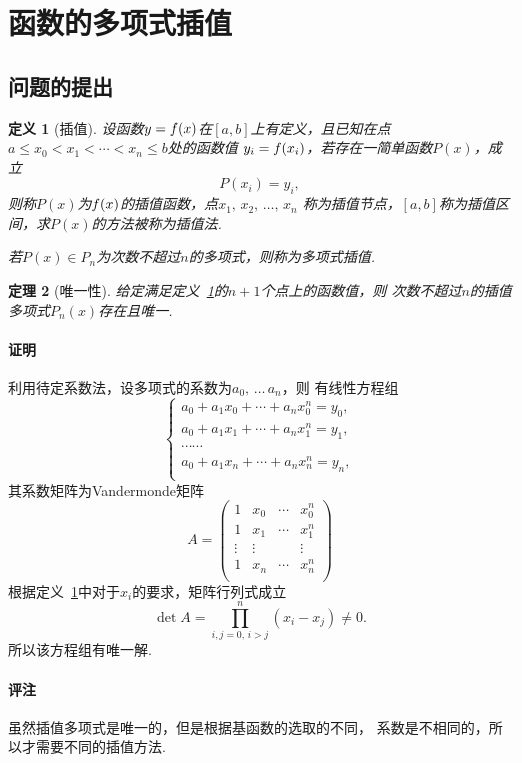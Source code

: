 \documentclass[12pt, a4paper]{article}
\theoremstyle{margin}
\newtheorem{thm}{定理}
\newtheorem{defi}[thm]{定义}
\newcommand{\f}{\mathnormal{f}}
\newcommand\defref[1]{定义~\ref{#1}}
\newcommand{\remark}{\paragraph{评注}}
\newcommand{\proof}{\paragraph{证明}}
\begin{document}
\newpage
\section{函数的多项式插值}
\subsection{问题的提出}
  \begin{defi}[插值]
    \label{defi: 插值}
    设函数$y = \f(x)$在$[a, b]$上有定义，且已知在点
    $a\le x_0 < x_1 < \cdots < x_n \le b$处的函数值
    $y_i = \f(x_i)$，若存在一简单函数$P(x)$，成立
    \[
      P(x_i) = y_i,
    \]
    则称$P(x)$为$\f(x)$的插值函数，点$x_1,\,x_2,\,\dots,\,x_n$
    称为插值节点，$[a, b]$称为插值区间，求$P(x)$的方法被称为插值法. \par
    若$P(x) \in P_n$为次数不超过$n$的多项式，则称为多项式插值.
  \end{defi}

  \begin{thm}[唯一性]
    给定满足\defref{defi: 插值}的$n+1$个点上的函数值，则
    次数不超过$n$的插值多项式$P_n(x)$存在且唯一.
  \end{thm}
  \proof
    利用待定系数法，设多项式的系数为$a_0,\,\dots\,a_n$，则
    有线性方程组
    \[
      \left\{
      \begin{gathered}
          a_0 + a_1x_0 + \cdots + a_nx_0^n = y_0,\\
          a_0 + a_1x_1 + \cdots + a_nx_1^n = y_1,\\
          \cdots\cdots \\
          a_0 + a_1x_n + \cdots + a_nx_n^n = y_n,\\
      \end{gathered}
      \right.
    \]
    其系数矩阵为Vandermonde矩阵
    \[
      A =
      \begin{pmatrix}
        1 & x_0 & \cdots & x_0^n \\
        1 & x_1 & \cdots & x_1^n \\
        \vdots & \vdots & & \vdots \\
        1 & x_n & \cdots & x_n^n \\
      \end{pmatrix}
    \]
    根据\defref{defi: 插值}中对于$x_i$的要求，矩阵行列式成立
    \[
      \det A = \prod_{i,j=0,\,i>j}^n (x_i - x_j) \ne 0.
    \]
    所以该方程组有唯一解.
  \remark
    虽然插值多项式是唯一的，但是根据基函数的选取的不同，
    系数是不相同的，所以才需要不同的插值方法.
\end{document}
